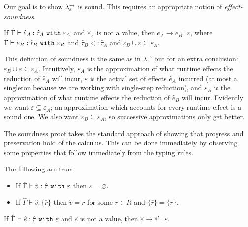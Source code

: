 \noindent
Our goal is to show $\lambda^{\rightarrow}_{\varepsilon}$ is sound. This requires an appropriate notion of \textit{effect-soundness}.

\begin{theorem}[Soundness]
If $\hat \Gamma \vdash \hat e_A: \hat \tau_A~\mathtt{with}~ \varepsilon_A$ and $\hat e_A$ is not a value, then $e_A \longrightarrow e_B~|~\varepsilon$, where $\hat \Gamma \vdash e_B: \hat \tau_B~\mathtt{with}~ \varepsilon_B$ and $\hat \tau_B <: \hat \tau_A$ and $\varepsilon_B \cup \varepsilon \subseteq \varepsilon_A$.
\end{theorem}

\noindent
This definition of soundness is the same as in $\lambda^{\rightarrow}$ but for an extra conclusion: $\varepsilon_B \cup \varepsilon \subseteq \varepsilon_A$. Intuitively, $\varepsilon_A$ is the approximation of what runtime effects the reduction of $\hat e_A$ will incur, $\varepsilon$ is the actual set of effects $\hat e_A$ incurred (at most a singleton because we are working with single-step reduction), and $\varepsilon_B$ is the approximation of what runtime effects the reduction of $\hat e_B$ will incur. Evidently we want $\varepsilon \subseteq \varepsilon_A$; an approximation which accounts for every runtime effect is a sound one. We also want $\varepsilon_B \subseteq \varepsilon_A$, so successive approximations only get better.

The soundness proof takes the standard approach of showing that progress and preservation hold of the calculus. This can be done immediately by observing some properties that follow immediately from the typing rules.

\begin{lemma}
The following are true:
\begin{itemize}
	\setlength\itemsep{-0.7em}
	\item If $\hat \Gamma \vdash \hat v: \hat \tau~\mathtt{with}~ \varepsilon$ then $\varepsilon = \varnothing$.
	\item If $\hat \Gamma \vdash \hat v: \{ \bar r \}$ then $\hat v = r$ for some $r \in R$ and $\{ \bar r \} = \{ r \}$.
\end{itemize}
\end{lemma}


\begin{theorem}[Progress]
If $\hat \Gamma \vdash \hat e: \hat \tau~\mathtt{with}~ \varepsilon$ and $\hat e$ is not a value, then $\hat e \longrightarrow \hat e'~|~\varepsilon$.
\end{theorem}

